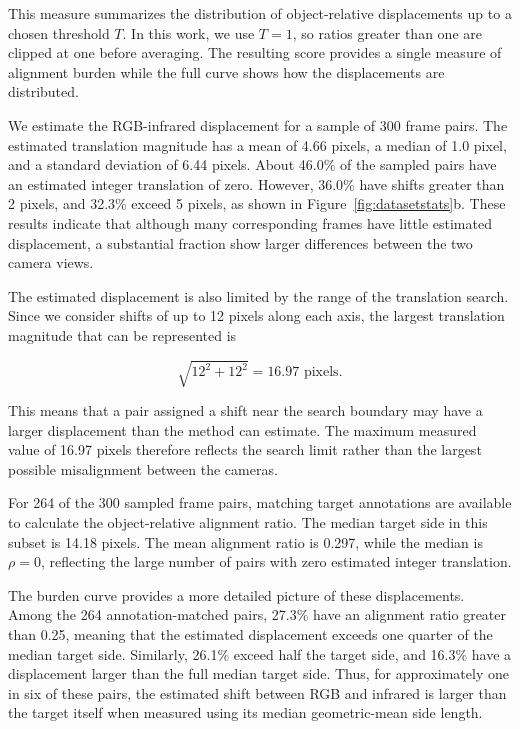 \documentclass[10pt]{article}
\begin{document}
This measure summarizes the distribution of object-relative displacements up to a chosen threshold $T$. In this work, we use $T=1$, so ratios greater than one are clipped at one before averaging. The resulting score provides a single measure of alignment burden while the full curve shows how the displacements are distributed.

We estimate the RGB-infrared displacement for a sample of 300 frame pairs. The estimated translation magnitude has a mean of 4.66 pixels, a median of 1.0 pixel, and a standard deviation of 6.44 pixels. About 46.0\% of the sampled pairs have an estimated integer translation of zero. However, 36.0\% have shifts greater than 2 pixels, and 32.3\% exceed 5 pixels, as shown in Figure~\ref{fig:datasetstats}b. These results indicate that although many corresponding frames have little estimated displacement, a substantial fraction show larger differences between the two camera views.

The estimated displacement is also limited by the range of the translation search. Since we consider shifts of up to 12 pixels along each axis, the largest translation magnitude that can be represented is

\begin{equation}
\sqrt{12^2+12^2}=16.97 \text{ pixels}.
\end{equation}

This means that a pair assigned a shift near the search boundary may have a larger displacement than the method can estimate. The maximum measured value of 16.97 pixels therefore reflects the search limit rather than the largest possible misalignment between the cameras.

For 264 of the 300 sampled frame pairs, matching target annotations are available to calculate the object-relative alignment ratio. The median target side in this subset is 14.18 pixels. The mean alignment ratio is 0.297, while the median is $\rho=0$, reflecting the large number of pairs with zero estimated integer translation.

The burden curve provides a more detailed picture of these displacements. Among the 264 annotation-matched pairs, 27.3\% have an alignment ratio greater than 0.25, meaning that the estimated displacement exceeds one quarter of the median target side. Similarly, 26.1\% exceed half the target side, and 16.3\% have a displacement larger than the full median target side. Thus, for approximately one in six of these pairs, the estimated shift between RGB and infrared is larger than the target itself when measured using its median geometric-mean side length.
\end{document}
